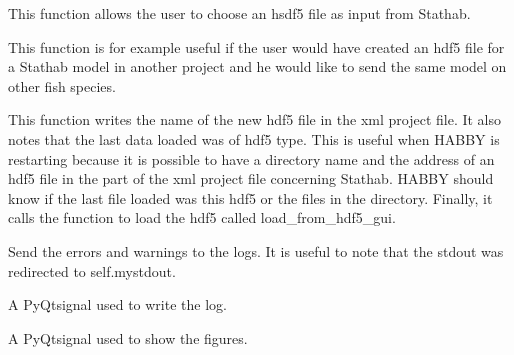 \documentclass[letterpaper,10pt,english]{sphinxmanual}
\begin{document}
\begin{fulllineitems}
\begin{fulllineitems}
\label{\detokenize{index:src_GUI.stathab_GUI.StathabW.select_hdf5}}
This function allows the user to choose an hsdf5 file as input from Stathab.


This function is for example useful if the user would have created an hdf5 file for a Stathab model in another
project and he would like to send the same model on other fish species.

This function writes the name of the new hdf5 file in the xml project file. It also notes that the last data
loaded was of hdf5 type. This is useful when HABBY is restarting because it is possible to have a
directory name and the address of an hdf5 file in the part of the xml project file concerning Stathab.
HABBY should know if the last file loaded was this hdf5 or the files in the directory.
Finally, it calls the function to load the hdf5 called load\_from\_hdf5\_gui.

\end{fulllineitems}


\begin{fulllineitems}
\label{\detokenize{index:src_GUI.stathab_GUI.StathabW.send_err_log}}
Send the errors and warnings to the logs. It is useful to note that the stdout was redirected to self.mystdout.

\end{fulllineitems}


\begin{fulllineitems}
\label{\detokenize{index:src_GUI.stathab_GUI.StathabW.send_log}}
A PyQtsignal used to write the log.

\end{fulllineitems}


\begin{fulllineitems}
\label{\detokenize{index:src_GUI.stathab_GUI.StathabW.show_fig}}
A PyQtsignal used to show the figures.

\end{fulllineitems}


\end{fulllineitems}
\end{document}
